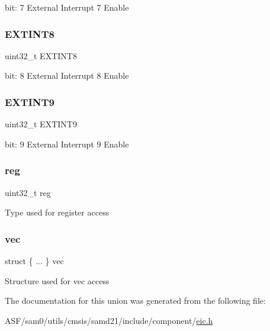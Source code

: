 bit\+: 7 External Interrupt 7 Enable \mbox{\label{union_e_i_c___i_n_t_e_n_s_e_t___type_aab9d762f86dec3f39445ee2ad1c41196}} 
\subsubsection{\texorpdfstring{EXTINT8}{EXTINT8}}
{\footnotesize\ttfamily uint32\+\_\+t E\+X\+T\+I\+N\+T8}

bit\+: 8 External Interrupt 8 Enable \mbox{\label{union_e_i_c___i_n_t_e_n_s_e_t___type_abd6774c81c28d04fbef1daa87929c1d3}} 
\subsubsection{\texorpdfstring{EXTINT9}{EXTINT9}}
{\footnotesize\ttfamily uint32\+\_\+t E\+X\+T\+I\+N\+T9}

bit\+: 9 External Interrupt 9 Enable \mbox{\label{union_e_i_c___i_n_t_e_n_s_e_t___type_a6b91636401516a477989a336376d7b40}} 
\subsubsection{\texorpdfstring{reg}{reg}}
{\footnotesize\ttfamily uint32\+\_\+t reg}

Type used for register access \mbox{\label{union_e_i_c___i_n_t_e_n_s_e_t___type_a481b25c88c28df5cf867363b0a6c7f2d}} 
\subsubsection{\texorpdfstring{vec}{vec}}
{\footnotesize\ttfamily struct \{ ... \}   vec}

Structure used for vec access 

The documentation for this union was generated from the following file\+:\begin{DoxyCompactItemize}
\item 
A\+S\+F/sam0/utils/cmsis/samd21/include/component/\mbox{\hyperlink{component_2eic_8h}{eic.\+h}}\end{DoxyCompactItemize}
